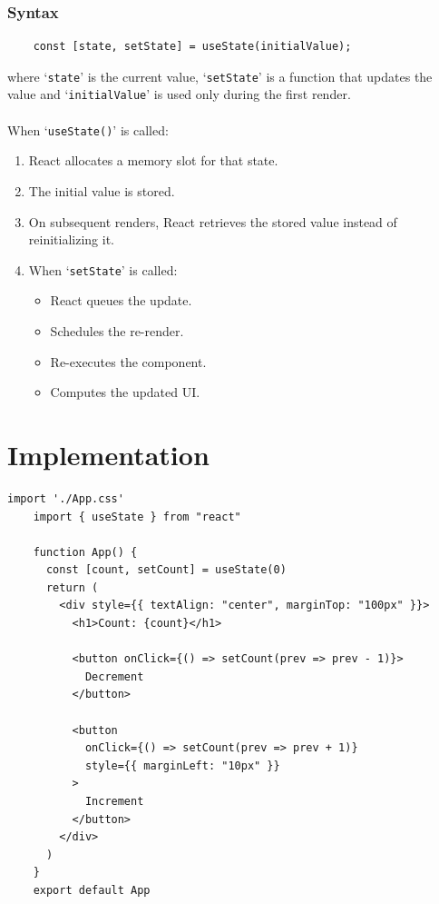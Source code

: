\documentclass[12pt, a4paper]{report}
\begin{document}
    \subsubsection{Syntax}
    \begin{lstlisting}
    const [state, setState] = useState(initialValue);
    \end{lstlisting}
    where `\texttt{state}' is the current value, `\texttt{setState}' is a function that updates the value and `\texttt{initialValue}' is used only during the first render.
    \\\\
    When `\texttt{useState()}' is called:
    \begin{enumerate}
        \item React allocates a memory slot for that state.
        \item The initial value is stored.
        \item On subsequent renders, React retrieves the stored value instead of reinitializing it.
        \item When `\texttt{setState}' is called:
        \begin{itemize}
            \item React queues the update.
            \item Schedules the re-render.
            \item Re-executes the component.
            \item Computes the updated UI.
        \end{itemize}
    \end{enumerate}

    \section{Implementation}
    \begin{lstlisting}[caption={\texttt{App.jsx}}]
    import './App.css'
    import { useState } from "react"

    function App() {
      const [count, setCount] = useState(0)
      return (
        <div style={{ textAlign: "center", marginTop: "100px" }}>
          <h1>Count: {count}</h1>

          <button onClick={() => setCount(prev => prev - 1)}>
            Decrement
          </button>

          <button
            onClick={() => setCount(prev => prev + 1)}
            style={{ marginLeft: "10px" }}
          >
            Increment
          </button>
        </div>
      )
    }
    export default App
    \end{lstlisting}
\end{document}
